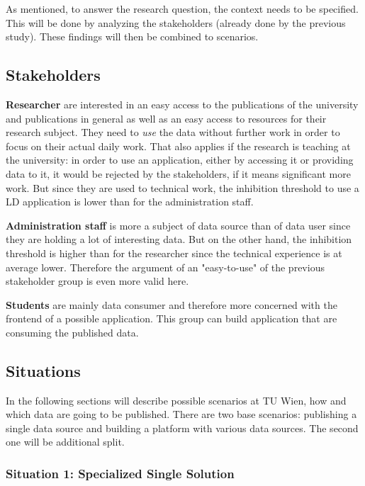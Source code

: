 As mentioned, to answer the research question, the context needs to be specified. 
This will be done by analyzing the stakeholders (already done by the previous 
study). These findings will then be combined to scenarios.

\subsection{Stakeholders}

\textbf{Researcher} are interested in an easy access to the publications of the 
university and publications in general as well as an easy access to resources for 
their research subject. They need to \emph{use} the data without further work in 
order to focus on their actual daily work. That also applies if the research is 
teaching at the university: in order to use an application, either by accessing it 
or providing data to it, it would be rejected by the stakeholders, if it means 
significant more work. But since they are used to technical work, the inhibition 
threshold to use a LD application is lower than for the administration staff.

\textbf{Administration staff} is more a subject of data source than of data user 
since they are holding a lot of interesting data. But on the other hand, the 
inhibition threshold is higher than for the researcher since the technical 
experience is at average lower. Therefore the argument of an "easy-to-use" of the 
previous stakeholder group is even more valid here.

\textbf{Students} are mainly data consumer and therefore more concerned with the 
frontend of a possible application. This group can build application that are 
consuming the published data.

\subsection{Situations}

In the following sections will describe possible scenarios at TU Wien, how and 
which data are going to be published. There are two base scenarios: publishing a 
single data source and building a platform with various data sources. The second 
one will be additional split.

\subsubsection{Situation 1: Specialized Single Solution}

